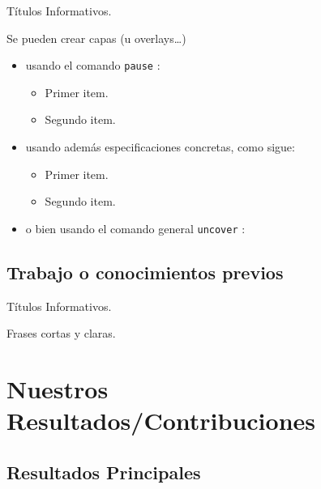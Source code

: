 \documentclass{beamer}
\begin{document}
\begin{frame}{Títulos Informativos.}

  Se pueden crear capas (u overlays\dots)
  \begin{itemize}
  \item usando el comando \texttt{pause} :
    \begin{itemize}
    \item
      Primer item.
      \pause
    \item    
      Segundo item.
    \end{itemize}
  \item
    usando además especificaciones concretas, como sigue:
    \begin{itemize}
    \item<3->
      Primer item.
    \item<4->
      Segundo item.
    \end{itemize}
  \item
    o bien usando el comando general \texttt{uncover} :
    \begin{itemize}
    \end{itemize}
  \end{itemize}
\end{frame}


\subsection{Trabajo o conocimientos previos}

\begin{frame}{Títulos Informativos.}
\end{frame}

\begin{frame}{Frases cortas y claras.}
\end{frame}



\section{Nuestros Resultados/Contribuciones}

\subsection{Resultados Principales}
\end{document}
